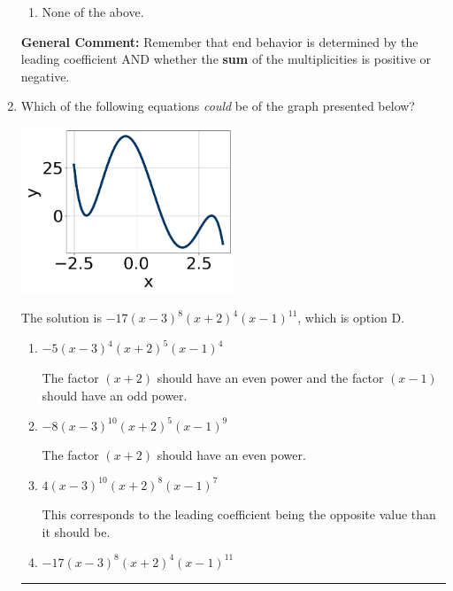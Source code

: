 \documentclass{extbook}[14pt]
\newcommand{\litem}[1]{\item #1

\rule{\textwidth}{0.4pt}}
\begin{document}
\begin{enumerate}
{\begin{enumerate}[label=\Alph*.]
\item None of the above.\end{enumerate}
\textbf{General Comment:} Remember that end behavior is determined by the leading coefficient AND whether the \textbf{sum} of the multiplicities is positive or negative.
}
\litem{
Which of the following equations \textit{could} be of the graph presented below?

\begin{center}
    \includegraphics[width=0.5\textwidth]{../Figures/polyGraphToFunctionCopyA.png}
\end{center}


The solution is \( -17(x - 3)^{8} (x + 2)^{4} (x - 1)^{11} \), which is option D.\begin{enumerate}[label=\Alph*.]
\item \( -5(x - 3)^{4} (x + 2)^{5} (x - 1)^{4} \)

The factor $(x + 2)$ should have an even power and the factor $(x - 1)$ should have an odd power.
\item \( -8(x - 3)^{10} (x + 2)^{5} (x - 1)^{9} \)

The factor $(x + 2)$ should have an even power.
\item \( 4(x - 3)^{10} (x + 2)^{8} (x - 1)^{7} \)

This corresponds to the leading coefficient being the opposite value than it should be.
\item \( -17(x - 3)^{8} (x + 2)^{4} (x - 1)^{11} \)


\end{enumerate}}
\end{enumerate}
\end{document}
